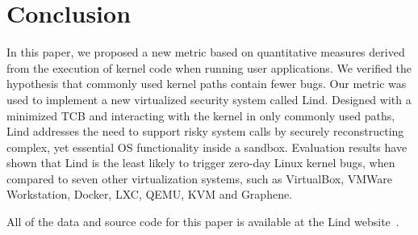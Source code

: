 \section{Conclusion}
\label{sec.conclusion}

%
In this paper, we proposed a new metric based on quantitative measures derived from
the execution of kernel code when running user applications.
We verified the hypothesis that commonly used kernel paths contain fewer bugs.
Our metric was used to implement a new virtualized security system called Lind. Designed with a minimized
TCB and interacting with the kernel in only commonly used paths, Lind addresses the need to 
support risky system calls by securely reconstructing complex, yet essential OS functionality inside a sandbox.
%
Evaluation results have shown that Lind is the least likely to trigger zero-day Linux kernel bugs,
when compared to seven other virtualization systems, such as VirtualBox, VMWare Workstation, Docker, LXC, 
QEMU, KVM and Graphene.

All of the data and source code for this paper is available at the Lind website~\cite{Lind}. 
